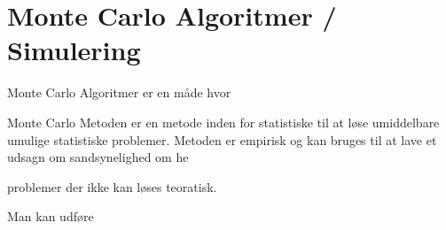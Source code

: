 \documentclass[../SRP.tex]{subfiles}
\begin{document}
\chapter{Monte Carlo Algoritmer / Simulering}

Monte Carlo Algoritmer er en måde hvor 

Monte Carlo Metoden er en metode inden for statistiske til at løse umiddelbare 
umulige statistiske problemer. Metoden er empirisk og kan bruges til at lave et
udsagn om sandsynelighed om he 

problemer der ikke kan løses teoratisk.

Man kan udføre
\end{document}
